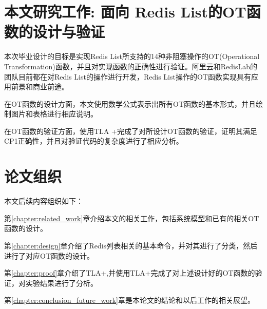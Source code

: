 \section{本文研究工作: 面向 Redis List的OT函数的设计与验证}
	\par 本次毕业设计的目标是实现Redis List所支持的14种非阻塞操作的OT(Operational Transformation)函数，并且对实现函数的正确性进行验证。阿里云和RedisLab的团队目前都在对Redis List的操作进行开发，Redis List操作的OT函数实现具有应用前景和商业前途。

	\par 在OT函数的设计方面，本文使用数学公式表示出所有OT函数的基本形式，并且绘制图片和表格进行相应说明。

	\par 在OT函数的验证方面，使用TLA +完成了对所设计OT函数的验证，证明其满足CP1正确性，并且对验证代码的复杂度进行了相应分析。
\section{论文组织}
	\par 本文后续内容组织如下：
	\par 第\ref{chapter:related_work}章介绍本文的相关工作，包括系统模型和已有的相关OT函数的设计。
	\par 第\ref{chapter:design}章介绍了Redis列表相关的基本命令，并对其进行了分类，然后进行了对应OT函数的设计。
	\par 第\ref{chapter:proof}章介绍了TLA+,并使用TLA+完成了对上述设计好的OT函数的验证，对实验结果进行了分析。
	\par 第\ref{chapter:conclusion_future_work}章是本论文的结论和以后工作的相关展望。
